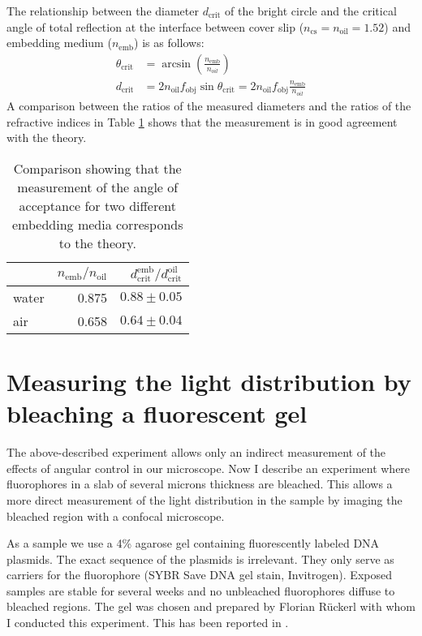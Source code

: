 The relationship between the diameter $d_\textrm{crit}$ of the bright
circle and the critical angle of total reflection at the interface
between cover slip ($n_\textrm{cs}=n_\textrm{oil}=1.52$) and embedding
medium ($n_\textrm{emb}$) is as follows:
\begin{align}
  \theta_\textrm{crit}&=\arcsin\left(\frac{n_\textrm{emb}}{n_{oil}}\right) \\
  d_\textrm{crit} &= 2 n_\textrm{oil} f_\textrm{obj}
  \sin\theta_\textrm{crit}= 2 n_\textrm{oil} f_\textrm{obj}
  \frac{n_\textrm{emb}}{n_{oil}}
\end{align}
A comparison between the ratios of the measured diameters and the
ratios of the refractive indices in Table \ref{tab:acceptance} shows
that the measurement is in good agreement with the theory.
\begin{table}[!hbt]
  \centering
  \begin{tabular}{ l r r }
\toprule
    & $n_\textrm{emb}/n_\textrm{oil}$ & $d^\textrm{emb}_\textrm{crit}/ d^\textrm{oil}_\textrm{crit}$ \\  \midrule
    water & 0.875 & $0.88\pm0.05$ \\
    air & 0.658 & $0.64\pm0.04$ \\
\bottomrule
  \end{tabular}
  \caption{Comparison showing that the measurement of the angle of acceptance for two different embedding media corresponds to the theory.}
  \label{tab:acceptance}
\end{table}


\section{Measuring the light distribution by bleaching a fluorescent gel}
The above-described experiment allows only an indirect measurement of the
effects of angular control in our microscope. Now I describe an
experiment where fluorophores in a slab of several microns thickness
are bleached. This allows a more direct measurement of the light
distribution in the sample by imaging the bleached region with a
confocal microscope.

As a sample we use a 4\% agarose gel containing fluorescently labeled
DNA plasmids. The exact sequence of the plasmids is irrelevant. They
only serve as carriers for the fluorophore (SYBR Save DNA gel stain,
Invitrogen). Exposed samples are stable for several weeks and no
unbleached fluorophores diffuse to bleached regions. The gel was
chosen and prepared by Florian R\"uckerl with whom I conducted this
experiment. This has been reported in \cite{Ruckerl}.

